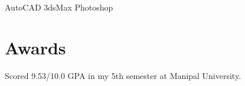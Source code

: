 \documentclass[a4paper]{resume}
\begin{document}
\begin{minipage}[t]{0.33\textwidth}
\vspace{2mm}

AutoCAD \textbullet{} 3dsMax \textbullet{} Photoshop

\sectionspace %


\section{Awards}

Scored 9.53/10.0 GPA in my 5th semester at Manipal University.

\sectionspace %


\end{minipage} %
\hfill
%
%
\end{document}
